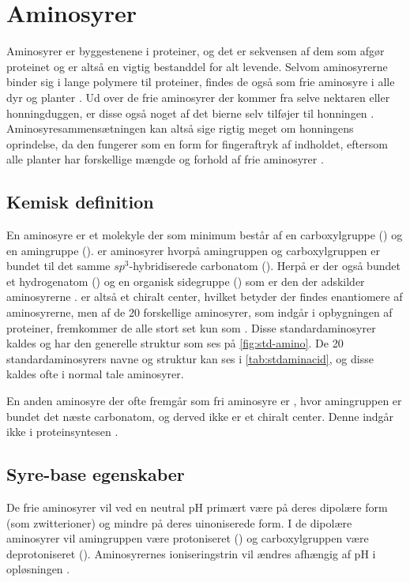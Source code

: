 \section{Aminosyrer}\label{sec:amino}
Aminosyrer er byggestenene i proteiner, og det er sekvensen af dem som afgør proteinet \parencite{biotech} og er altså en vigtig bestanddel for alt levende.
Selvom aminosyrerne binder sig i lange polymere til proteiner, findes de også som frie aminosyre i alle dyr og planter \parencite{freeAA}.
Ud over de frie aminosyrer der kommer fra selve nektaren eller honningduggen, er disse også noget af det bierne selv tilføjer til honningen \parencite{sugarhoney}.
Aminosyresammensætningen kan altså sige rigtig meget om honningens oprindelse, da den fungerer som en form for fingeraftryk af indholdet, eftersom alle planter har forskellige mængde og forhold af frie aminosyrer \parencite{aminoplants,honneyLex}.
\subsection{Kemisk definition}

En aminosyre er et molekyle der som minimum består af en carboxylgruppe () og en amingruppe ()\footnotemark{}.
 er aminosyrer hvorpå amingruppen og carboxylgruppen er bundet til det samme $sp^3$-hybridiserede carbonatom ().
Herpå er der også bundet et hydrogenatom () og en organisk sidegruppe () som er den der adskilder aminosyrerne \parencite{aminoBrit}.
 er altså et chiralt center,\footnotemark{} hvilket betyder der findes enantiomere af aminosyrerne, men af de 20 forskellige aminosyrer, som indgår i opbygningen af proteiner, fremkommer de alle stort set kun som  \parencite{basisA,chemana}.
Disse standardaminosyrer kaldes  og har den generelle struktur som ses på \cref{fig:std-amino}.
De 20 standardaminosyrers navne og struktur kan ses i \cref{tab:stdaminacid}, og disse kaldes ofte i normal tale aminosyrer.
\par En anden aminosyre der ofte fremgår som fri aminosyre er , hvor amingruppen er bundet det næste carbonatom, og  derved ikke er et chiralt center.
Denne indgår ikke i proteinsyntesen \parencite{freeAA}.

\subsection{Syre-base egenskaber}\label{subsec:aminoPH}
De frie aminosyrer vil ved en neutral pH primært være på deres dipolære form (som zwitterioner) og mindre på deres uinoniserede form.
I de dipolære aminosyrer vil amingruppen være protoniseret () og carboxylgruppen være deprotoniseret ().
Aminosyrernes ioniseringstrin vil ændres afhængig af pH i opløsningen \parencite{aminoBrit,chemana}.
